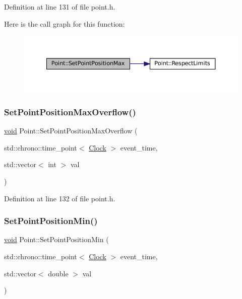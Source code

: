 Definition at line 131 of file point.\+h.

Here is the call graph for this function\+:\nopagebreak
\begin{figure}[H]
\begin{center}
\leavevmode
\includegraphics[width=350pt]{class_point_adb2897b1a7bde15e81b72cb59342f186_cgraph}
\end{center}
\end{figure}
\mbox{\label{class_point_a29aca71cae82195775f3822740df80ec}} 
\subsubsection{\texorpdfstring{Set\+Point\+Position\+Max\+Overflow()}{SetPointPositionMaxOverflow()}}
{\footnotesize\ttfamily \mbox{\hyperlink{glad_8h_a950fc91edb4504f62f1c577bf4727c29}{void}} Point\+::\+Set\+Point\+Position\+Max\+Overflow (\begin{DoxyParamCaption}\item[{std\+::chrono\+::time\+\_\+point$<$ \mbox{\hyperlink{universe_8h_a0ef8d951d1ca5ab3cfaf7ab4c7a6fd80}{Clock}} $>$}]{event\+\_\+time,  }\item[{std\+::vector$<$ int $>$}]{val }\end{DoxyParamCaption})\hspace{0.3cm}{\ttfamily [inline]}}



Definition at line 132 of file point.\+h.

\mbox{\label{class_point_ad47980a6ed515a2def172d757af46f1a}} 
\subsubsection{\texorpdfstring{Set\+Point\+Position\+Min()}{SetPointPositionMin()}}
{\footnotesize\ttfamily \mbox{\hyperlink{glad_8h_a950fc91edb4504f62f1c577bf4727c29}{void}} Point\+::\+Set\+Point\+Position\+Min (\begin{DoxyParamCaption}\item[{std\+::chrono\+::time\+\_\+point$<$ \mbox{\hyperlink{universe_8h_a0ef8d951d1ca5ab3cfaf7ab4c7a6fd80}{Clock}} $>$}]{event\+\_\+time,  }\item[{std\+::vector$<$ double $>$}]{val }\end{DoxyParamCaption})\hspace{0.3cm}{\ttfamily [inline]}}



